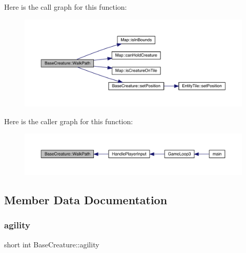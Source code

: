Here is the call graph for this function\+:
\nopagebreak
\begin{figure}[H]
\begin{center}
\leavevmode
\includegraphics[width=350pt]{d2/d3b/class_base_creature_aaecab78bf5a5a5293079634e813f854f_cgraph}
\end{center}
\end{figure}
Here is the caller graph for this function\+:
\nopagebreak
\begin{figure}[H]
\begin{center}
\leavevmode
\includegraphics[width=350pt]{d2/d3b/class_base_creature_aaecab78bf5a5a5293079634e813f854f_icgraph}
\end{center}
\end{figure}


\subsection{Member Data Documentation}
\mbox{\label{class_base_creature_a23bbce83de8f7be2dfbcec7f5da223ab}} 
\subsubsection{\texorpdfstring{agility}{agility}}
{\footnotesize\ttfamily short int Base\+Creature\+::agility\hspace{0.3cm}{\ttfamily [private]}}

\mbox{\label{class_base_creature_ab40c21845e4c19538b356bbcb01f7075}} 
